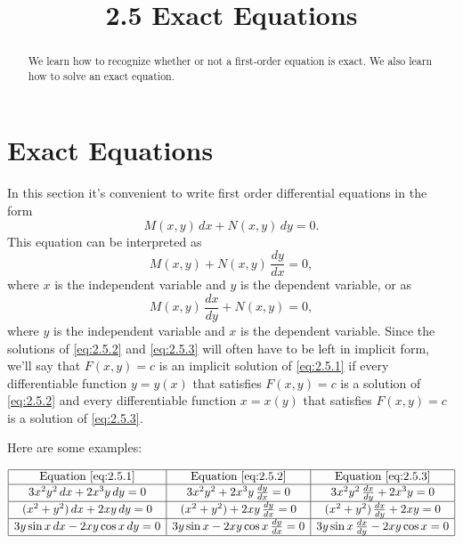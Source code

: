 \documentclass{ximera}
\title{2.5 Exact Equations}
\begin{document}
 
\begin{abstract}
We learn how to recognize whether or not a first-order equation is exact.  We also learn how to solve an exact equation.
\end{abstract}
 
\maketitle
 
\section*{Exact Equations}
 
In this  section it's convenient to write first order
differential equations in the form
\begin{equation} \label{eq:2.5.1}
M(x,y)\,dx+N(x,y)\,dy=0.
\end{equation}
This equation  can be interpreted as
\begin{equation} \label{eq:2.5.2}
M(x,y)+N(x,y)\,\frac{dy}{dx}=0,
\end{equation}
where $x$ is the independent variable and $y$ is the dependent
variable, or as
\begin{equation} \label{eq:2.5.3}
M(x,y)\,\frac{dx}{dy}+N(x,y)=0,
\end{equation}
where $y$ is the independent variable and $x$ is the dependent
variable. Since the solutions of \eqref{eq:2.5.2} and \eqref{eq:2.5.3} will
often have to be left in
implicit form, we'll say that $F(x,y)=c$ is an implicit solution of
\eqref{eq:2.5.1} if every differentiable function $y=y(x)$ that satisfies
$F(x,y)=c$ is a solution of \eqref{eq:2.5.2} and every
differentiable function $x=x(y)$ that satisfies $F(x,y)=c$ is a
solution of \eqref{eq:2.5.3}.
 
Here are  some examples:
 

$$ 
\begin{array}{|c|c|c|} \hline
\text{Equation }\eqref{eq:2.5.1}&\text{Equation } \eqref{eq:2.5.2}&\text{Equation }\eqref{eq:2.5.3}
\\\hline
3x^2y^2\,dx+2x^3y\,dy =0 & 3x^2y^2+2x^3y\,\frac{dy}{dx} =0  &3x^2y^2\,\frac{dx}{dy}+2x^3y=0
\\\hline
(x^2+y^2)\,dx +2xy\,dy=0 &
(x^2+y^2)+2xy\,\frac{dy}{dx}=0&
(x^2+y^2)\,\frac{dx}{dy} +2xy=0
\\\hline
3y\sin x\,dx-2xy\cos x\,dy =0
&3y\sin x-2xy\cos x\,\frac{dy}{dx} =0
& 3y\sin x\,\frac{dx}{dy}-2xy\cos x  =0
\\\hline
\end{array}
$$
 
\end{document}
